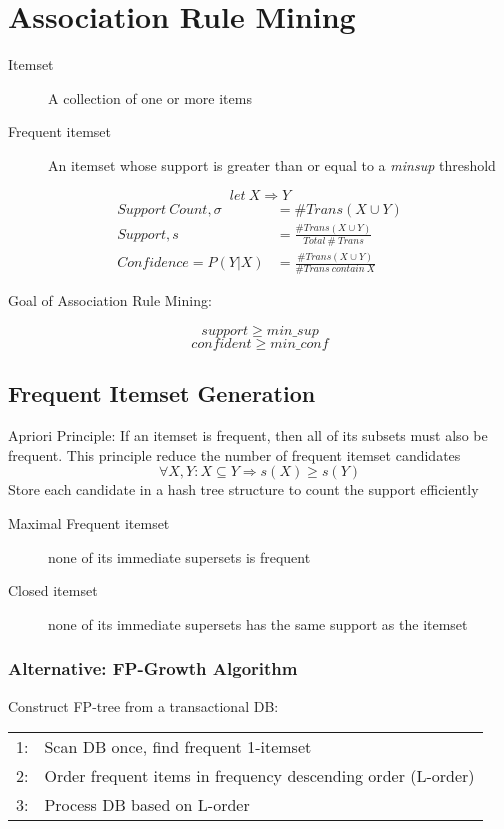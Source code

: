 \chapter{Association Rule Mining}

\begin{description}
\item[Itemset] A collection of one or more items
\item[Frequent itemset] An itemset whose support is greater than or equal to a \emph{minsup} threshold
\end{description}

$$let\ {X \Rightarrow Y}$$
\begin{align*}
Support\ Count, \sigma &=\# Trans(X \cup Y) \\
Support, s &= \frac{\# Trans(X \cup Y)}{Total\ \#\ Trans} \\
Confidence=P(Y|X)&=\frac{\# Trans(X \cup Y)}{\# Trans\ contain\ X}
\end{align*}

\noindent Goal of Association Rule Mining:

$$support \ge min\_sup$$
$$confident \ge min\_conf$$

\section{Frequent Itemset Generation}

Apriori Principle: If an itemset is frequent, then all of its subsets must also be frequent. This principle reduce the number of frequent itemset candidates
$$\forall X, Y: X \subseteq Y \Rightarrow s(X) \ge s(Y)$$
Store each candidate in a hash tree structure to count the support efficiently \\

\begin{description}
\item[Maximal Frequent itemset] none of its immediate supersets is frequent
\item [Closed itemset] none of its immediate supersets has the same support as the itemset
\end{description}

\subsection{Alternative: FP-Growth Algorithm}
Construct FP-tree from a transactional DB:
\begin{table}[h!]
\begin{tabular}{r p{12cm}}
\hline
    1: & Scan DB once, find frequent 1-itemset\\
    2: & Order frequent items in frequency descending order (L-order)\\
    3: & Process DB based on L-order\\
\hline
\end{tabular}
\end{table}

